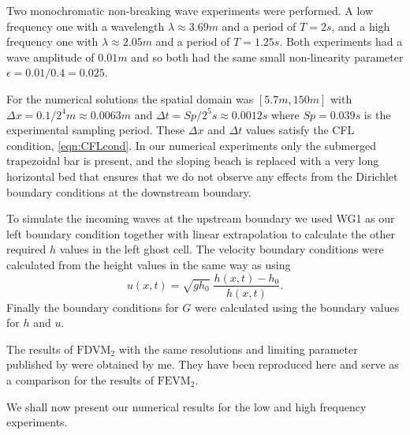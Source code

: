 Two monochromatic non-breaking wave experiments were performed. A low frequency one with a wavelength $\lambda \approx 3.69m$ and a period of $T = 2s$, and a high frequency one with $\lambda \approx 2.05m$ and a period of $T = 1.25s$. Both experiments had a wave amplitude of $0.01m$ and so both had the same small non-linearity parameter $\epsilon = 0.01 / 0.4 = 0.025$. 

For the numerical solutions the spatial domain was $\left[5.7m,150m\right]$ with $\Delta x = 0.1 / 2^4 m \approx 0.0063m$ and $\Delta t = Sp / 2^5 s \approx 0.0012s$ where $Sp = 0.039 s$ is the experimental sampling period. These $\Delta x$ and $\Delta t$ values satisfy the CFL condition, \eqref{eqn:CFLcond}. In our numerical experiments only the submerged trapezoidal bar is present, and the sloping beach is replaced with a very long horizontal bed that ensures that we do not observe any effects from the Dirichlet boundary conditions at the downstream boundary.

To simulate the incoming waves at the upstream boundary we used WG1 as our left boundary condition together with linear extrapolation to calculate the other required $h$ values in the left ghost cell. The velocity boundary conditions were calculated from the height values in the same way as \citet{Beji-Battjes-1994-1} using
\begin{equation*}
u(x,t) = \sqrt{g h_0} \; \dfrac{h(x,t) - h_0}{h(x,t)}.
\end{equation*}
Finally the boundary conditions for $G$ were calculated using the boundary values for $h$ and $u$. 

The results of $\text{FDVM}_2$ with the same resolutions and limiting parameter published by \citet{Zoppou-etal-2017} were obtained by me. They have been reproduced here and serve as a comparison for the results of $\text{FEVM}_2$. 

We shall now present our numerical results for the low and high frequency experiments.
%

